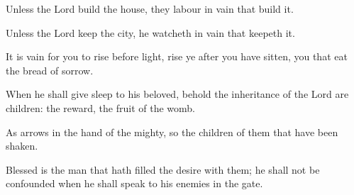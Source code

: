 ﻿\item Unless the Lord build the house, they labour in vain that build it.
\item Unless the Lord keep the city, he watcheth in vain that keepeth it.
\item It is vain for you to rise before light, rise ye after you have sitten, you that eat the bread of sorrow.
\item When he shall give sleep to his beloved, behold the inheritance of the Lord are children: the reward, the fruit of the womb.
\item As arrows in the hand of the mighty, so the children of them that have been shaken.
\item Blessed is the man that hath filled the desire with them; he shall not be confounded when he shall speak to his enemies in the gate.